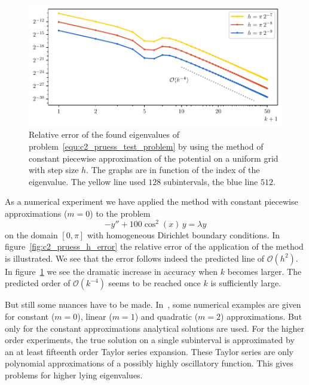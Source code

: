 \begin{figure}
    \begin{center}
        \includegraphics[width=\textwidth]{img/chapter2/pruess_k_error.pdf}
    \end{center}
    \caption{Relative error of the found eigenvalues of problem~\eqref{equ:c2_pruess_test_problem} by using the method of constant piecewise approximation of the potential on a uniform grid with step size $h$. The graphs are in function of the index of the eigenvalue. The yellow line used $128$ subintervals, the blue line $512$.}
    \label{fig:c2_pruess_k_error}
\end{figure}

As a numerical experiment we have applied the method with constant piecewise approximations ($m=0$) to the problem
\begin{equation}\label{equ:c2_pruess_test_problem}
    -y'' + 100 \cos^2(x) \,y = \lambda y
\end{equation}
on the domain $[0, \pi]$ with homogeneous Dirichlet boundary conditions. In figure~\ref{fig:c2_pruess_h_error} the relative error of the application of the method is illustrated. We see that the error follows indeed the predicted line of $\mathcal{O}(h^2)$. In figure~\ref{fig:c2_pruess_k_error} we see the dramatic increase in accuracy when $k$ becomes larger. The predicted order of $\mathcal{O}(k^{-4})$ seems to be reached once $k$ is sufficiently large.


But still some nuances have to be made. In~\cite{pruess_estimating_1973}, some numerical examples are given for constant ($m=0$), linear ($m=1$) and quadratic ($m=2$) approximations. But only for the constant approximations analytical solutions are used. For the higher order experiments, the true solution on a single subinterval is approximated by an at least fifteenth order Taylor series expansion. These Taylor series are only polynomial approximations of a possibly highly oscillatory function. This gives problems for higher lying eigenvalues.

